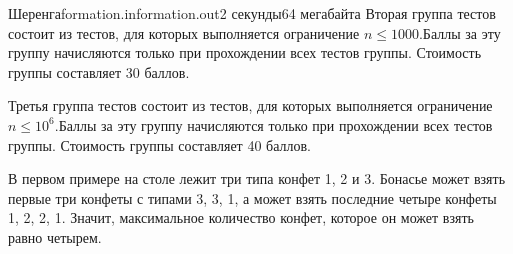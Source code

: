 \begin{problem}{Шеренга}{formation.in}{formation.out}{2 секунды}{64 мегабайта}
Вторая группа тестов состоит из тестов, для которых выполняется ограничение $n \le 1000$.Баллы за эту группу начисляются только при прохождении всех тестов группы. Стоимость группы составляет 30 баллов.

Третья группа тестов состоит из тестов, для которых выполняется ограничение $n \le 10^6$.Баллы за эту группу начисляются только при прохождении всех тестов группы. Стоимость группы составляет 40 баллов.

\Example

\begin{example}
%
\end{example}

\Note
В первом примере на столе лежит три типа конфет 1, 2 и 3.
Бонасье может взять первые три конфеты с типами 3, 3, 1, а может взять последние четыре конфеты 1, 2, 2, 1. Значит, максимальное количество конфет, которое он может взять равно четырем.

\end{problem}
